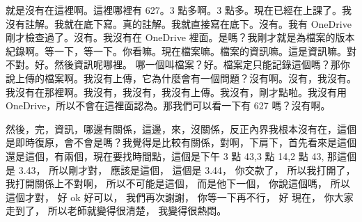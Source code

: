 \hypertarget{c11:cue:71}{}就是沒有在這裡啊。這裡哪裡有 627。3 點多啊。3 點多。現在已經在上課了。我沒有註解。我就在底下寫。真的註解。我就直接寫在底下。沒有。我有 OneDrive 剛才檢查過了。沒有。我沒有在 OneDrive 裡面。是嗎？我剛才就是為檔案的版本紀錄啊。等一下，等一下。你看嘛。現在檔案嘛。檔案的資訊嘛。這是資訊嘛。對不對。好。然後資訊呢哪裡。
\hypertarget{c11:cue:72}{}哪一個叫檔案？好。檔案定只能記錄這個嗎？那你說上傳的檔案啊。我沒有上傳，它為什麼會有一個問題？沒有啊。沒有，我沒有。我沒有在那裡啊。我沒有，我沒有，我沒有上傳。我沒有，剛才點啦。我沒有用 OneDrive，所以不會在這裡面認為。那我們可以看一下有 627 嗎？沒有啊。

\hypertarget{c11:cue:73}{}然後，完，資訊，哪邊有關係，這邊，來，沒關係，反正內界我根本沒有在，這個是即時復原，會不會是嗎？我覺得是比較有關係，對啊，下肩下，首先看來是這個還是這個，有兩個，現在要找時間點，這個是下午 3 點 43,3 點 14,2 點 43,
\hypertarget{c11:cue:74}{}那這個是 3.43，
\hypertarget{c11:cue:75}{}所以剛才對，
\hypertarget{c11:cue:76}{}應該是這個，
\hypertarget{c11:cue:77}{}這個是 3.44，
\hypertarget{c11:cue:78}{}你交款了，
\hypertarget{c11:cue:79}{}所以我打開了，
\hypertarget{c11:cue:80}{}我打開關係上不對啊，
\hypertarget{c11:cue:81}{}所以不可能是這個，
\hypertarget{c11:cue:82}{}而是他下一個，
\hypertarget{c11:cue:83}{}你說這個嗎，
\hypertarget{c11:cue:84}{}所以這個才對，
\hypertarget{c11:cue:85}{}好 ok 好可以，
\hypertarget{c11:cue:86}{}我們再次謝謝，
\hypertarget{c11:cue:87}{}你等一下再不行，
\hypertarget{c11:cue:88}{}好 現在，
\hypertarget{c11:cue:89}{}你大家走到了，
\hypertarget{c11:cue:90}{}所以老師就變得很清楚，
\hypertarget{c11:cue:91}{}我變得很熱悶。

